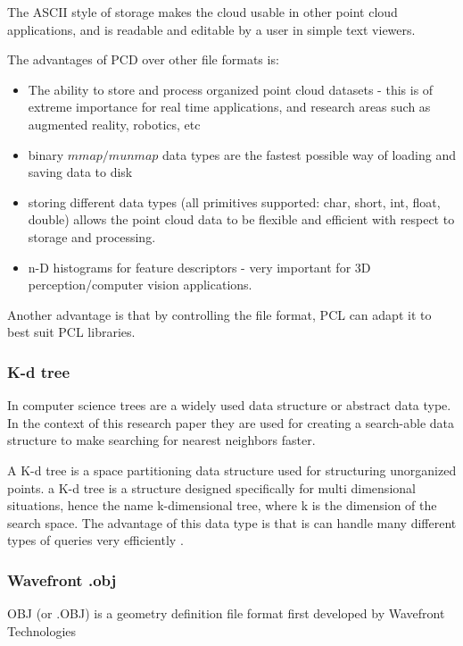 			The ASCII style of storage makes the cloud usable in other point cloud applications, and is readable and editable by a user in simple text viewers.
			
			The advantages of PCD over other file formats is:
			\begin{itemize}
				\item  The ability to store and process organized point cloud datasets - this is of extreme importance for real time applications, and research areas such as augmented reality, robotics, etc
				
				\item binary $mmap/munmap$ data types are the fastest possible way of loading and saving data to disk
				
				\item storing different data types (all primitives supported: char, short, int, float, double) allows the point cloud data to be flexible and efficient with respect to storage and processing.
				
				\item n-D histograms for feature descriptors - very important for 3D perception/computer vision applications.
			\end{itemize}
			
			Another advantage is that by controlling the file format, PCL can adapt it to best suit PCL libraries.
		
		\subsubsection{K-d tree}
			In computer science trees are a widely used data structure or abstract data type. In the context of this research paper they are used for creating a search-able data structure to make searching for nearest neighbors faster.
			
			A K-d tree is a space partitioning data structure used for structuring unorganized points. a K-d tree is a structure designed specifically for multi dimensional situations, hence the name k-dimensional tree, where k is the dimension of the search space. The advantage of this data type is that is can handle many different types of queries very efficiently \citep{bentley_multidimensional_1975}.
		
		
		\subsubsection{Wavefront .obj}
			OBJ (or .OBJ) is a geometry definition file format first developed by Wavefront Technologies
		
